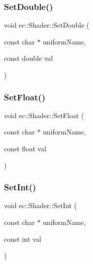 \mbox{\label{classec_1_1_shader_af2ce6812aa1db454168449a7a4e202f5}} 
\subsubsection{\texorpdfstring{Set\+Double()}{SetDouble()}}
{\footnotesize\ttfamily void ec\+::\+Shader\+::\+Set\+Double (\begin{DoxyParamCaption}\item[{const char $\ast$}]{uniform\+Name,  }\item[{const double}]{val }\end{DoxyParamCaption})}

\mbox{\label{classec_1_1_shader_aee1df257423576414f395004ecb11c02}} 
\subsubsection{\texorpdfstring{Set\+Float()}{SetFloat()}}
{\footnotesize\ttfamily void ec\+::\+Shader\+::\+Set\+Float (\begin{DoxyParamCaption}\item[{const char $\ast$}]{uniform\+Name,  }\item[{const float}]{val }\end{DoxyParamCaption})}

\mbox{\label{classec_1_1_shader_aa2df78739294d1815502bec14ea4a907}} 
\subsubsection{\texorpdfstring{Set\+Int()}{SetInt()}}
{\footnotesize\ttfamily void ec\+::\+Shader\+::\+Set\+Int (\begin{DoxyParamCaption}\item[{const char $\ast$}]{uniform\+Name,  }\item[{const int}]{val }\end{DoxyParamCaption})}

\mbox{\label{classec_1_1_shader_a9119ca6857ef2cb77046e399bffcabcb}} 
